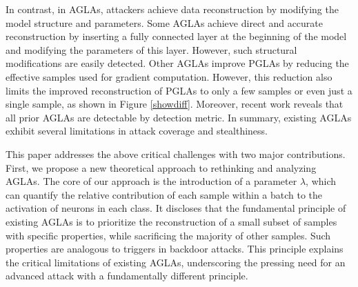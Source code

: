 In contrast, in AGLAs, attackers achieve data reconstruction by modifying the model structure and parameters. Some AGLAs \cite{boenisch2023curious, zhao2023loki, fowl2021robbing, nowak2024qbi} achieve direct and accurate reconstruction by inserting a fully connected layer at the beginning of the model and modifying the parameters of this layer. However, such structural modifications are easily detected. Other AGLAs \cite{wen2022fishing, Garov2024Hiding} improve PGLAs by reducing the effective samples used for gradient computation. However, this reduction also limits the improved reconstruction of PGLAs to only a few samples or even just a single sample, as shown in Figure \ref{showdiff}. Moreover, recent work \cite{Garov2024Hiding} reveals that all prior AGLAs are detectable by detection metric. In summary, existing AGLAs exhibit several limitations in attack coverage and stealthiness.




This paper addresses the above critical challenges with two major contributions. First, we propose a new theoretical approach to rethinking and analyzing AGLAs. The core of our approach is the introduction of a parameter $\lambda$, which can quantify the relative contribution of each sample within a batch to the activation of neurons in each class. It discloses that the fundamental principle of existing AGLAs is to prioritize the reconstruction of a small subset of samples with specific properties, while sacrificing the majority of other samples. Such properties are analogous to triggers in backdoor attacks. This principle explains the critical limitations of existing AGLAs, underscoring the pressing need for an advanced attack with a fundamentally different principle. 

